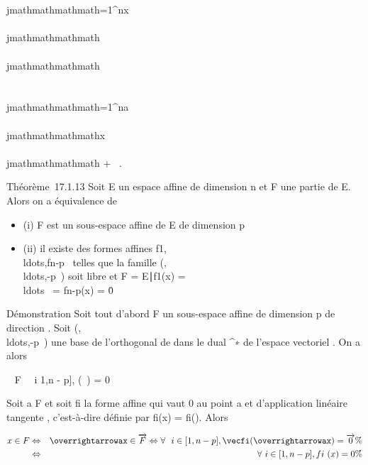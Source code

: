 \\\\jmathmathmathmath=1^nx\\\\jmathmathmathmath\vece\\\\jmathmathmathmath\mapsto~\\\sum
 \\\\jmathmathmathmath=1^na\\\\jmathmathmathmathx\\\\jmathmathmathmath + \alpha~.

Théorème~17.1.13 Soit E un espace affine de dimension n et F une partie
de E. Alors on a équivalence de

\begin{itemize}
\itemsep1pt\parskip0pt
\item
  (i) F est un sous-espace affine de E de dimension p
\item
  (ii) il existe des formes affines
  f1,\\ldots,fn-p~
  telles que la famille
  (,\\ldots,\vecfn-p~)
  soit libre et F = \x \in
  E∣f1(x) =
  \\ldots~ =
  fn-p(x) = 0\.
\end{itemize}

Démonstration Soit tout d'abord F un sous-espace affine de dimension p
de direction \overrightarrowF. Soit
(,\\ldots,\vecfn-p~)
une base de l'orthogonal de \overrightarrowF dans le
dual \overrightarrowE^∗ de l'espace
vectoriel \overrightarrowE. On a alors

\overrightarrow\xi~ \in\overrightarrow
F \Leftrightarrow \forall~~i \in {[}1,n -
p{]},
\vecfi(\overrightarrow\xi~)
= 0

Soit a \in F et soit fi la forme affine qui vaut 0 au point a et
d'application linéaire tangente \vecfi,
c'est-à-dire définie par fi(x) =\vec
fi(\overrightarrowax). Alors

\begin{align*} x \in F& \Leftrightarrow
& \overrightarrowax
\in\overrightarrow F \Leftrightarrow
\forall~~i \in {[}1,n - p{]},
\vecfi(\overrightarrowax)
=\overrightarrow 0\%&
\\ & \Leftrightarrow &
\forall~i \in {[}1,n - p{]}, fi~(x) = 0 \%&
\\ \end{align*}

